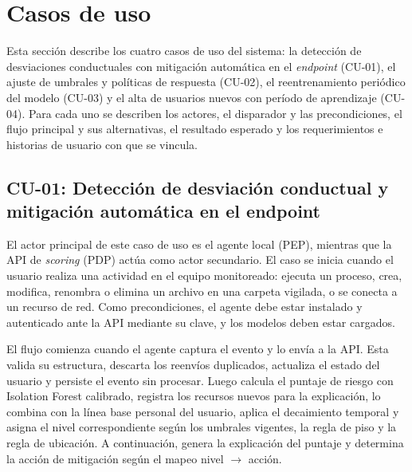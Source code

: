 \section{Casos de uso}
\label{sec:casos-de-uso}

Esta sección describe los cuatro casos de uso del sistema: la detección de desviaciones conductuales con mitigación automática en el \emph{endpoint} (CU-01), el ajuste de umbrales y políticas de respuesta (CU-02), el reentrenamiento periódico del modelo (CU-03) y el alta de usuarios nuevos con período de aprendizaje (CU-04). Para cada uno se describen los actores, el disparador y las precondiciones, el flujo principal y sus alternativas, el resultado esperado y los requerimientos e historias de usuario con que se vincula.

\subsection{CU-01: Detección de desviación conductual y mitigación automática en el endpoint}
\label{sec:cu01}

El actor principal de este caso de uso es el agente local (PEP), mientras que la API de \emph{scoring} (PDP) actúa como actor secundario. El caso se inicia cuando el usuario realiza una actividad en el equipo monitoreado: ejecuta un proceso, crea, modifica, renombra o elimina un archivo en una carpeta vigilada, o se conecta a un recurso de red. Como precondiciones, el agente debe estar instalado y autenticado ante la API mediante su clave, y los modelos deben estar cargados.

El flujo comienza cuando el agente captura el evento y lo envía a la API. Esta valida su estructura, descarta los reenvíos duplicados, actualiza el estado del usuario y persiste el evento sin procesar. Luego calcula el puntaje de riesgo con Isolation Forest calibrado, registra los recursos nuevos para la explicación, lo combina con la línea base personal del usuario, aplica el decaimiento temporal y asigna el nivel correspondiente según los umbrales vigentes, la regla de piso y la regla de ubicación. A continuación, genera la explicación del puntaje y determina la acción de mitigación según el mapeo nivel $\rightarrow$ acción.

